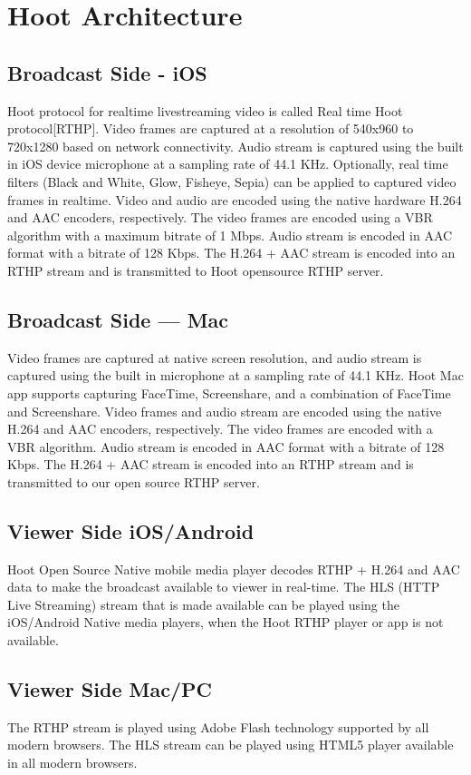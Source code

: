 \section{Hoot Architecture}
\subsection{Broadcast Side - iOS}
Hoot protocol for realtime livestreaming video is called Real time Hoot protocol[RTHP].
Video frames are captured at a resolution of 540x960 to 720x1280 based on network connectivity. Audio stream is captured using the built in iOS device microphone at a sampling rate of 44.1 KHz. Optionally, real time filters (Black and White, Glow, Fisheye, Sepia) can be applied to captured video frames in realtime. Video and audio are encoded using the native hardware H.264 and AAC encoders, respectively. The video frames are encoded using a VBR algorithm with a maximum bitrate of 1 Mbps. Audio stream is encoded in AAC format with a bitrate of 128 Kbps. The H.264 + AAC stream is encoded into an RTHP stream and is transmitted to Hoot opensource RTHP server.

\subsection{Broadcast Side — Mac}
Video frames are captured at native screen resolution, and audio stream is captured using the built in microphone at a sampling rate of 44.1 KHz. Hoot Mac app supports capturing FaceTime, Screenshare, and a combination of FaceTime and Screenshare. Video frames and audio stream are encoded using the native H.264 and AAC encoders, respectively. The video frames are encoded with a VBR algorithm. Audio stream is encoded in AAC format with a bitrate of 128 Kbps. The H.264 + AAC stream is encoded into an RTHP stream and is transmitted to our open source RTHP server.

\subsection{Viewer Side iOS/Android }
 Hoot Open Source Native mobile media player decodes RTHP + H.264 and AAC data to make the broadcast available to viewer in real-time. The HLS (HTTP Live Streaming) stream that is made available can be played using the iOS/Android Native media players, when the Hoot RTHP player or app is not available.

\subsection{Viewer Side Mac/PC} 
The RTHP stream is played using Adobe Flash technology supported by all modern browsers. The HLS stream can be played using HTML5 player available in all modern browsers.

